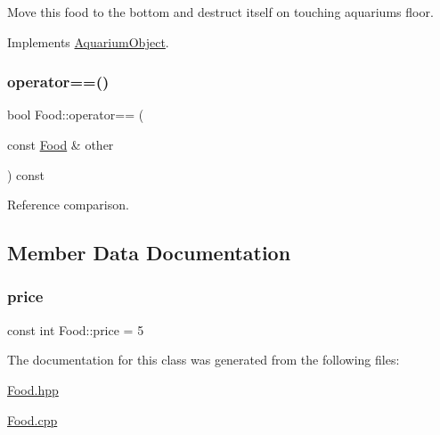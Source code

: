 Move this food to the bottom and destruct itself on touching aquariums\textquotesingle{} floor. 



Implements \mbox{\hyperlink{class_aquarium_object_a42c4de640f89ac8aebc26b7618578575}{Aquarium\+Object}}.

\mbox{\label{class_food_a7199d2bd48ecae8ffbbf1be8a39c5311}} 
\subsubsection{\texorpdfstring{operator==()}{operator==()}}
{\footnotesize\ttfamily bool Food\+::operator== (\begin{DoxyParamCaption}\item[{const \mbox{\hyperlink{class_food}{Food}} \&}]{other }\end{DoxyParamCaption}) const}



Reference comparison. 



\subsection{Member Data Documentation}
\mbox{\label{class_food_af54f2090e84e95fcdc95f5c2d93386df}} 
\subsubsection{\texorpdfstring{price}{price}}
{\footnotesize\ttfamily const int Food\+::price = 5\hspace{0.3cm}{\ttfamily [static]}}



The documentation for this class was generated from the following files\+:\begin{DoxyCompactItemize}
\item 
\mbox{\hyperlink{_food_8hpp}{Food.\+hpp}}\item 
\mbox{\hyperlink{_food_8cpp}{Food.\+cpp}}\end{DoxyCompactItemize}
